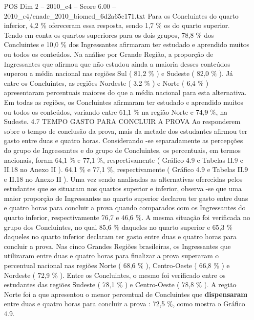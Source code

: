 \begin{textsample}{POS Dim 2 – 2010\_c4 – Score 6.00 – 2010\_c4/enade\_2010\_biomed\_6d2a65c171.txt}
Para os Concluintes do quarto inferior, 4,2 \% ofereceram essa resposta, sendo 1,7 \% os do quarto superior.
Tendo em conta os quartos superiores para os dois grupos, 78,8 \% dos Concluintes e 10,0 \% dos Ingressantes afirmaram ter estudado e aprendido muitos ou todos os conteúdos.
Na análise por Grande Região, a proporção de Ingressantes que afirmou que não estudou ainda a maioria desses conteúdos superou a média nacional nas regiões Sul ( 81,2 \% ) e Sudeste ( 82,0 \% ).
Já entre os Concluintes, as regiões Nordeste ( 3,2 \% ) e Norte ( 6,4 \% ) apresentaram percentuais maiores do que a média nacional para esta alternativa.
Em todas as regiões, os Concluintes afirmaram ter estudado e aprendido muitos ou todos os conteúdos, variando entre 61,1 \% na região Norte e 74,9 \%, na Sudeste. 4.7 TEMPO GASTO PARA CONCLUIR A PROVA Ao responderem sobre o tempo de conclusão da prova, mais da metade dos estudantes afirmou ter gasto entre duas e quatro horas.
Considerando -se separadamente as percepções do grupo de Ingressantes e do grupo de Concluintes, os percentuais, em termos nacionais, foram 64,1 \% e 77,1 \%, respectivamente ( Gráfico 4.9 e Tabelas II.9 e II.18 no Anexo II ). 64,1 \% e 77,1 \%, respectivamente ( Gráfico 4.9 e Tabelas II.9 e II.18 no Anexo II ).
Uma vez sendo analisadas as alternativas oferecidas pelos estudantes que se situaram nos quartos superior e inferior, observa -se que uma maior proporção de Ingressantes no quarto superior declarou ter gasto entre duas e quatro horas para concluir a prova quando comparados com os Ingressantes do quarto inferior, respectivamente 76,7 e 46,6 \%.
A mesma situação foi verificada no grupo dos Concluintes, no qual 85,6 \% daqueles no quarto superior e 65,3 \% daqueles no quarto inferior declaram ter gasto entre duas e quatro horas para concluir a prova.
Nas cinco Grandes Regiões brasileiras, os Ingressantes que utilizaram entre duas e quatro horas para finalizar a prova superaram o percentual nacional nas regiões Norte ( 68,6 \% ), Centro-Oeste ( 66,8 \% ) e Nordeste ( 72,9 \% ).
Entre os Concluintes, o mesmo foi verificado entre os estudantes das regiões Sudeste ( 78,1 \% ) e Centro-Oeste ( 78,8 \% ).
A região Norte foi a que apresentou o menor percentual de Concluintes que \textbf{dispensaram} entre duas e quatro horas para concluir a prova : 72,5 \%, como mostra o Gráfico 4.9.

\end{textsample}
